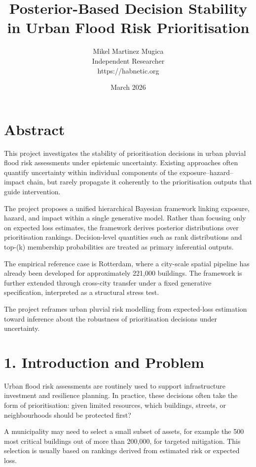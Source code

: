 \documentclass[
]{article}
\title{Posterior-Based Decision Stability in Urban Flood Risk
Prioritisation}
\author{Mikel Martinez Mugica\\
Independent Researcher\\
https://habnetic.org}
\date{March 2026}
\begin{document}
\maketitle

\section{Abstract}\label{abstract}

This project investigates the stability of prioritisation decisions in
urban pluvial flood risk assessments under epistemic uncertainty.
Existing approaches often quantify uncertainty within individual
components of the exposure--hazard--impact chain, but rarely propagate
it coherently to the prioritisation outputs that guide intervention.

The project proposes a unified hierarchical Bayesian framework linking
exposure, hazard, and impact within a single generative model. Rather
than focusing only on expected loss estimates, the framework derives
posterior distributions over prioritisation rankings. Decision-level
quantities such as rank distributions and top-(k) membership
probabilities are treated as primary inferential outputs.

The empirical reference case is Rotterdam, where a city-scale spatial
pipeline has already been developed for approximately 221,000 buildings.
The framework is further extended through cross-city transfer under a
fixed generative specification, interpreted as a structural stress test.

The project reframes urban pluvial risk modelling from expected-loss
estimation toward inference about the robustness of prioritisation
decisions under uncertainty.

\section{1. Introduction and Problem}\label{introduction-and-problem}

Urban flood risk assessments are routinely used to support
infrastructure investment and resilience planning. In practice, these
decisions often take the form of prioritisation: given limited
resources, which buildings, streets, or neighbourhoods should be
protected first?

A municipality may need to select a small subset of assets, for example
the 500 most critical buildings out of more than 200,000, for targeted
mitigation. This selection is usually based on rankings derived from
estimated risk or expected loss.
\end{document}
